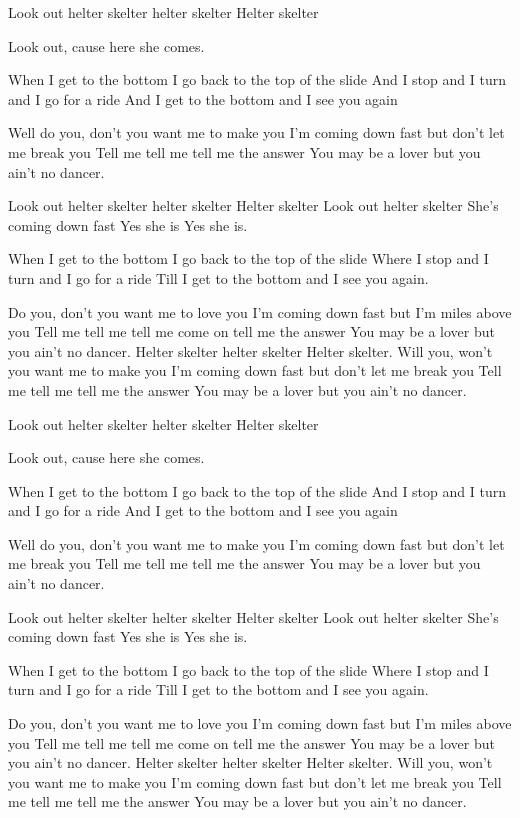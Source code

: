 Look out helter skelter helter skelter
Helter skelter 

Look out, cause here she comes.

When I get to the bottom I go back to the top of the slide
And I stop and I turn and I go for a ride
And I get to the bottom and I see you again

Well do you, don't you want me to make you
I'm coming down fast but don't let me break you
Tell me tell me tell me the answer
You may be a lover but you ain't no dancer.

Look out helter skelter helter skelter
Helter skelter
Look out helter skelter
She's coming down fast 
Yes she is 
Yes she is.

When I get to the bottom I go back to the top of the slide
Where I stop and I turn and I go for a ride
Till I get to the bottom and I see you again.

Do you, don't you want me to love you
I'm coming down fast but I’m miles above you
Tell me tell me tell me come on tell me the answer
You may be a lover but you ain't no dancer.
Helter skelter helter skelter
Helter skelter.
Will you, won't you want me to make you
I'm coming down fast but don't let me break you
Tell me tell me tell me the answer
You may be a lover but you ain't no dancer.

Look out helter skelter helter skelter
Helter skelter 

Look out, cause here she comes.

When I get to the bottom I go back to the top of the slide
And I stop and I turn and I go for a ride
And I get to the bottom and I see you again

Well do you, don't you want me to make you
I'm coming down fast but don't let me break you
Tell me tell me tell me the answer
You may be a lover but you ain't no dancer.

Look out helter skelter helter skelter
Helter skelter
Look out helter skelter
She's coming down fast 
Yes she is 
Yes she is.

When I get to the bottom I go back to the top of the slide
Where I stop and I turn and I go for a ride
Till I get to the bottom and I see you again.

Do you, don't you want me to love you
I'm coming down fast but I’m miles above you
Tell me tell me tell me come on tell me the answer
You may be a lover but you ain't no dancer.
Helter skelter helter skelter
Helter skelter.
Will you, won't you want me to make you
I'm coming down fast but don't let me break you
Tell me tell me tell me the answer
You may be a lover but you ain't no dancer.

